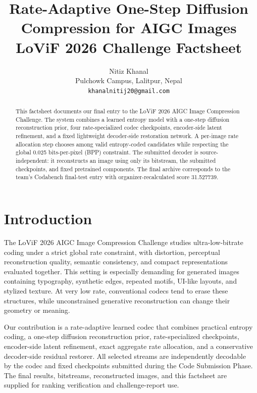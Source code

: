 \documentclass[10pt,twocolumn,letterpaper]{article}
\begin{document}
\title{Rate-Adaptive One-Step Diffusion Compression for AIGC Images\\LoViF 2026 Challenge Factsheet}
\author{Nitiz Khanal\\Pulchowk Campus, Lalitpur, Nepal\\{\tt\small khanalnitij20@gmail.com}}
\maketitle

\begin{abstract}
This factsheet documents our final entry to the LoViF 2026 AIGC Image Compression Challenge. The system combines a learned entropy model with a one-step diffusion reconstruction prior, four rate-specialized codec checkpoints, encoder-side latent refinement, and a fixed lightweight decoder-side restoration network. A per-image rate allocation step chooses among valid entropy-coded candidates while respecting the global 0.025 bits-per-pixel (BPP) constraint. The submitted decoder is source-independent: it reconstructs an image using only its bitstream, the submitted checkpoints, and fixed pretrained components. The final archive corresponds to the team's Codabench final-test entry with organizer-recalculated score 31.527739.
\end{abstract}

\section{Introduction}
The LoViF 2026 AIGC Image Compression Challenge studies ultra-low-bitrate coding under a strict global rate constraint, with distortion, perceptual reconstruction quality, semantic consistency, and compact representations evaluated together. This setting is especially demanding for generated images containing typography, synthetic edges, repeated motifs, UI-like layouts, and stylized texture. At very low rate, conventional codecs tend to erase these structures, while unconstrained generative reconstruction can change their geometry or meaning.

Our contribution is a rate-adaptive learned codec that combines practical entropy coding, a one-step diffusion reconstruction prior, rate-specialized checkpoints, encoder-side latent refinement, exact aggregate rate allocation, and a conservative decoder-side residual restorer. All selected streams are independently decodable by the codec and fixed checkpoints submitted during the Code Submission Phase. The final results, bitstreams, reconstructed images, and this factsheet are supplied for ranking verification and challenge-report use.
\end{document}
